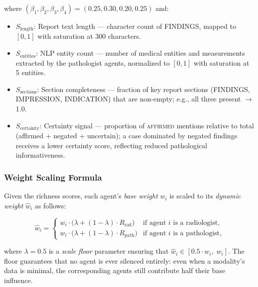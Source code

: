 \documentclass[12pt]{article}
\begin{document}
where $(\beta_1, \beta_2, \beta_3, \beta_4) = (0.25, 0.30, 0.20, 0.25)$ and:

\begin{itemize}
    \item $S_\text{length}$: Report text length --- character count of FINDINGS, mapped to $[0,1]$ with saturation at 300 characters.
    \item $S_\text{entities}$: NLP entity count --- number of medical entities and measurements extracted by the pathologist agents, normalized to $[0,1]$ with saturation at 5 entities.
    \item $S_\text{sections}$: Section completeness --- fraction of key report sections (FINDINGS, IMPRESSION, INDICATION) that are non-empty; e.g., all three present $\to$ 1.0.
    \item $S_\text{certainty}$: Certainty signal --- proportion of \textsc{affirmed} mentions relative to total (affirmed + negated + uncertain); a case dominated by negated findings receives a lower certainty score, reflecting reduced pathological informativeness.
\end{itemize}

\subsubsection{Weight Scaling Formula}

Given the richness scores, each agent's \emph{base weight} $w_i$ is scaled to its \emph{dynamic weight} $\hat{w}_i$ as follows:

\begin{equation}
\hat{w}_i =
\begin{cases}
w_i \cdot \bigl(\lambda + (1 - \lambda) \cdot R_\text{rad}\bigr) & \text{if agent $i$ is a radiologist,} \\
w_i \cdot \bigl(\lambda + (1 - \lambda) \cdot R_\text{path}\bigr) & \text{if agent $i$ is a pathologist,}
\end{cases}
\label{eq:dynamic-weight}
\end{equation}

where $\lambda = 0.5$ is a \emph{scale floor} parameter ensuring that $\hat{w}_i \in [0.5 \cdot w_i,\; w_i]$. The floor guarantees that no agent is ever silenced entirely: even when a modality's data is minimal, the corresponding agents still contribute half their base influence.
\end{document}
